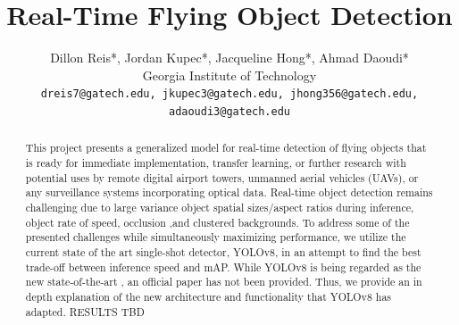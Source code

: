 \documentclass[10pt,twocolumn,letterpaper]{article}
\begin{document}
\title{Real-Time Flying Object Detection}

\author{Dillon Reis*, Jordan Kupec*, Jacqueline Hong*, Ahmad Daoudi*\\
Georgia Institute of Technology\\
{\tt\small dreis7@gatech.edu, jkupec3@gatech.edu, jhong356@gatech.edu, adaoudi3@gatech.edu}
}

\maketitle

\begin{abstract}
   This project presents a generalized model for real-time detection of flying objects that is ready for immediate implementation, transfer learning, or further research with potential uses by remote digital airport towers, unmanned aerial vehicles (UAVs), or any surveillance systems incorporating optical data. Real-time object detection remains challenging due to large variance object spatial sizes/aspect ratios during inference, object rate of speed, occlusion ,and clustered backgrounds. To address some of the presented challenges while simultaneously maximizing performance, we utilize the current state of the art single-shot detector, YOLOv8, in an attempt to find the best trade-off between inference speed and mAP. While YOLOv8 is being regarded as the new state-of-the-art \cite{YOLOv8Website}, an official paper has not been provided. Thus, we provide an in depth explanation of the new architecture and functionality that YOLOv8 has adapted. RESULTS TBD
\end{abstract}

\end{document}
